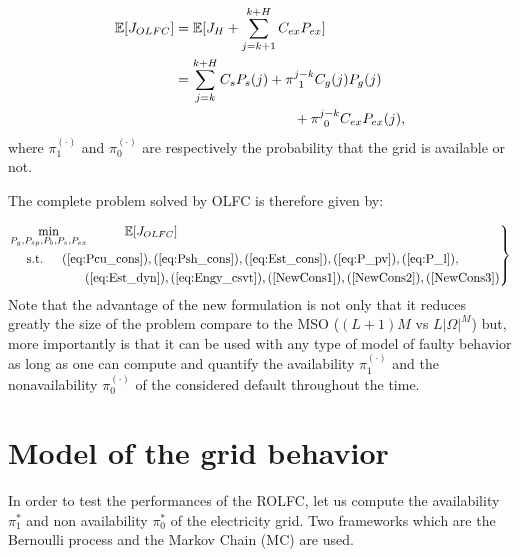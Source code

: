\documentclass[conference]{IEEEtran}
\begin{document}
\begin{equation}
    \begin{split}
        \mathbb{E}[J_{OLFC}] &=\mathbb{E}[J_H + \sum_{j=k+1}^{k+H}C_{ex}P_{ex}] \\
                             &=\sum_{j=k}^{k+H}  C_sP_s(j) + \pi_{\;\,1}^{j-k}C_g(j)P_g(j)\\
                             &\hspace{85px} + \pi_{\;\,0}^{j-k}C_{ex}P_{ex}(j), 
    \end{split}
\end{equation}where $\pi_1^{(\cdot)}$ and  $\pi_0^{(\cdot)}$ are respectively the probability that the grid is available or not. 

The complete problem solved by OLFC is therefore given by: 

\begin{equation}\label{eq:OLFCsys}
\left. 
\begin{aligned}
&\underset{P_g,P_{sp},P_b,P_s,P_{ex}}{\text{min}} \hspace{30px}\mathbb{E}[J_{OLFC}]\\
& \text{\hspace{10px} s.t.\hspace{15px}}(\ref{eq:Pcu_cons}),(\ref{eq:Psh_cons}),(\ref{eq:Est_cons}),(\ref{eq:P_pv}),(\ref{eq:P_l}),\\
& \hspace{60px}(\ref{eq:Est_dyn}),(\ref{eq:Engy_csvt}),(\ref{NewCons1}),(\ref{NewCons2}),(\ref{NewCons3})
\end{aligned}\right \}
\end{equation}
Note that the advantage of the new formulation is not only that it reduces greatly the size of the problem compare to the MSO ($(L+1)M$ vs $L|\Omega|^M$) but, more importantly is that it can be used with any type of model of faulty behavior as long as one can compute and quantify the availability $\pi_1^{(\cdot)}$ and the nonavailability $\pi_0^{(\cdot)}$ of the considered default throughout the time. 


\section {Model of the grid behavior}\label{ModelGriBeh}
In order to test the performances of the ROLFC, let us compute the availability $\pi_1^*$ and non availability $\pi_0^*$ of the electricity grid. Two frameworks which are the Bernoulli process  and the Markov Chain (MC)\cite{RBiRna1992} are used. 
\end{document}
